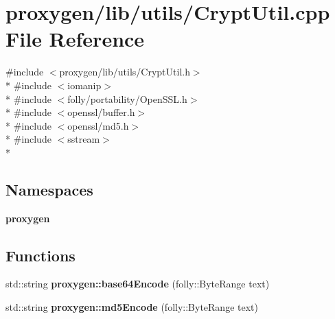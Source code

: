 \section{proxygen/lib/utils/\+Crypt\+Util.cpp File Reference}
\label{CryptUtil_8cpp}
{\ttfamily \#include $<$proxygen/lib/utils/\+Crypt\+Util.\+h$>$}\\*
{\ttfamily \#include $<$iomanip$>$}\\*
{\ttfamily \#include $<$folly/portability/\+Open\+S\+S\+L.\+h$>$}\\*
{\ttfamily \#include $<$openssl/buffer.\+h$>$}\\*
{\ttfamily \#include $<$openssl/md5.\+h$>$}\\*
{\ttfamily \#include $<$sstream$>$}\\*
\subsection*{Namespaces}
\begin{DoxyCompactItemize}
\item 
 {\bf proxygen}
\end{DoxyCompactItemize}
\subsection*{Functions}
\begin{DoxyCompactItemize}
\item 
std\+::string {\bf proxygen\+::base64\+Encode} (folly\+::\+Byte\+Range text)
\item 
std\+::string {\bf proxygen\+::md5\+Encode} (folly\+::\+Byte\+Range text)
\end{DoxyCompactItemize}
